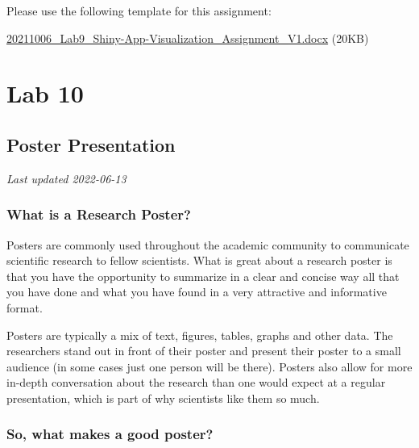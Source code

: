 \documentclass[
]{book}
\begin{document}
Please use the following template for this assignment:

\href{files/20211006_Lab9_Shiny-App-Visualization_Assignment_V1.docx}{20211006\_Lab9\_Shiny-App-Visualization\_Assignment\_V1.docx} (20KB)

\hypertarget{part-lab-10}{%
\part*{Lab 10}\label{part-lab-10}}

\hypertarget{poster-presentation}{%
\chapter*{Poster Presentation}\label{poster-presentation}}

\emph{Last updated 2022-06-13}

\hypertarget{what-is-a-research-poster}{%
\section*{What is a Research Poster?}\label{what-is-a-research-poster}}

Posters are commonly used throughout the academic community to communicate scientific research to fellow scientists. What is great about a research poster is that you have the opportunity to summarize in a clear and concise way all that you have done and what you have found in a very attractive and informative format.

Posters are typically a mix of text, figures, tables, graphs and other data. The researchers stand out in front of their poster and present their poster to a small audience (in some cases just one person will be there). Posters also allow for more in-depth conversation about the research than one would expect at a regular presentation, which is part of why scientists like them so much.

\hypertarget{so-what-makes-a-good-poster}{%
\section*{So, what makes a good poster?}\label{so-what-makes-a-good-poster}}
\end{document}
